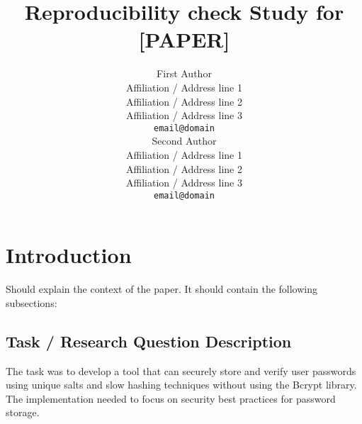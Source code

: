 \documentclass[11pt,a4paper]{article}
\title{Reproducibility check Study for [PAPER]}
\author{First Author \\
  Affiliation / Address line 1 \\
  Affiliation / Address line 2 \\
  Affiliation / Address line 3 \\
  \texttt{email@domain} \\\And
  Second Author \\
  Affiliation / Address line 1 \\
  Affiliation / Address line 2 \\
  Affiliation / Address line 3 \\
  \texttt{email@domain} \\}
\date{}
\begin{document}
\maketitle

\section{Introduction}

Should explain the context of the paper. It should contain the following subsections:

            \subsection{Task / Research Question Description} The task was to develop a tool that can securely store and verify user passwords using unique salts and slow hashing techniques without using the Bcrypt library. The implementation needed to focus on security best practices for password storage.
\end{document}
